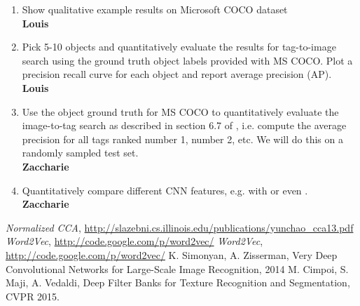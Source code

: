 \documentclass[a4paper,12pt]{article}
\begin{document}
\begin{enumerate}
  \item Show qualitative example results on Microsoft COCO dataset
  \\\textbf{Louis}
  \item Pick 5-10 objects and quantitatively evaluate the results for tag-to-image search using the ground truth object labels provided with MS COCO. Plot a precision recall curve for each object and report average precision (AP).
  \\\textbf{Louis}
  \item Use the object ground truth for MS COCO to quantitatively evaluate the image-to-tag search as described in section 6.7 of \cite{normalizedcca}, i.e. compute the average precision for all tags ranked number 1, number 2, etc. We will do this on a randomly sampled test set.
  \\\textbf{Zaccharie}
  \item Quantitatively compare different CNN features, e.g. \cite{overfeat} with \cite{vgg} or even \cite{deepfilters}.
  \\\textbf{Zaccharie}

\end{enumerate}


\begin{thebibliography}{7}

  \emph{Normalized CCA},
  \url{http://slazebni.cs.illinois.edu/publications/yunchao_cca13.pdf}
  \emph{Word2Vec},
  \url{http://code.google.com/p/word2vec/}
  \emph{Word2Vec},
  \url{http://code.google.com/p/word2vec/}
  K. Simonyan, A. Zisserman, Very Deep Convolutional Networks for Large-Scale Image Recognition, 2014
  M. Cimpoi, S. Maji, A. Vedaldi, Deep Filter Banks for Texture Recognition and Segmentation, CVPR 2015.
\end{thebibliography}
\end{document}
